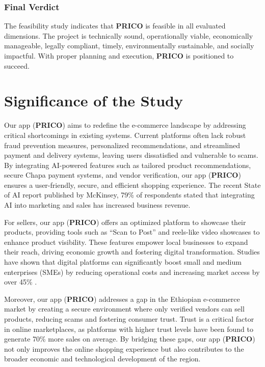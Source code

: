 \documentclass[12pt]{report}
\begin{document}
\subsubsection{Final Verdict}

The feasibility study indicates that \textbf{PRICO} is feasible in all evaluated dimensions. The
project is technically sound, operationally viable, economically manageable, legally
compliant, timely, environmentally sustainable, and socially impactful. With proper planning
and execution, \textbf{PRICO} is positioned to succeed.

\section{Significance of the Study}

Our app (\textbf{PRICO}) aims to redefine the e-commerce landscape by addressing critical
shortcomings in existing systems. Current platforms often lack robust fraud prevention
measures, personalized recommendations, and streamlined payment and delivery systems,
leaving users dissatisfied and vulnerable to scams. By integrating AI-powered features such
as tailored product recommendations, secure Chapa payment systems, and vendor
verification, our app (\textbf{PRICO}) ensures a user-friendly, secure, and efficient shopping
experience. The recent State of AI report published by McKinsey, 79\% of respondents stated
that integrating AI into marketing and sales has increased business revenue\cite{c13}.

For sellers, our app (\textbf{PRICO}) offers an optimized platform to showcase their products,
providing tools such as “Scan to Post” and reels-like video showcases to enhance product
visibility. These features empower local businesses to expand their reach, driving economic
growth and fostering digital transformation. Studies have shown that digital platforms can
significantly boost small and medium enterprises (SMEs) by reducing operational costs and
increasing market access by over 45\% \cite{c14}.

Moreover, our app (\textbf{PRICO}) addresses a gap in the Ethiopian e-commerce market by
creating a secure environment where only verified vendors can sell products, reducing scams
and fostering consumer trust. Trust is a critical factor in online marketplaces, as platforms
with higher trust levels have been found to generate 70\% more sales on average\cite{c15}. By
bridging these gaps, our app (\textbf{PRICO}) not only improves the online shopping experience but
also contributes to the broader economic and technological development of the region.
\end{document}
